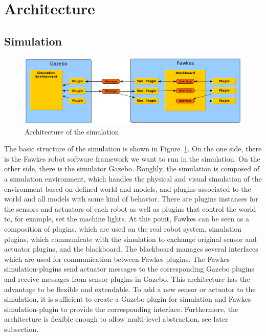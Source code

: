 \section{Architecture}

\subsection{Simulation}
\begin{figure}
\includegraphics[width=\textwidth]{tabs/fawkes_gazebo}
\caption{Architecture of the simulation}
\label{fig:fawkes_gazebo}
\end{figure}
The basic structure of the simulation is shown in Figure~\ref{fig:fawkes_gazebo}. On the one side, there is the Fawkes robot software framework we want to run in the simulation. On the other side, there is the simulator Gazebo. Roughly, the simulation is composed of a simulation environment, which handles the physical and visual simulation of the environment based on defined world and models, and plugins associated to the world and all models with some kind of behavior. There are plugins instances for the sensors and actuators of each robot as well as plugins that control the world to, for example, set the machine lights. At this point, Fawkes can be seen as a composition of plugins, which are used on the real robot system, simulation plugins, which communicate with the simulation to exchange original sensor and actuator plugins, and the blackboard. The blackboard manages several interfaces which are used for communication between Fawkes plugins. The Fawkes simulation-plugins send actuator messages to the corresponding Gazebo plugins and receive messages from sensor-plugins in Gazebo. This architecture has the advantage to be flexible and extendable. To add a new sensor or actuator to the simulation, it is sufficient to create a Gazebo plugin for simulation and Fawkes simulation-plugin to provide the corresponding interface. Furthermore, the architecture is flexible enough to allow multi-level abstraction, see later subsection.


